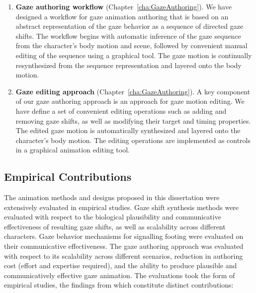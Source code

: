 \begin{enumerate}
\item \textbf{Gaze authoring workflow} (Chapter~\ref{cha:GazeAuthoring}). We have designed a workflow for gaze animation authoring that is based on an abstract representation of the gaze behavior as a sequence of directed gaze shifts. The workflow begins with automatic inference of the gaze sequence from the character's body motion and scene, followed by convenient manual editing of the sequence using a graphical tool. The gaze motion is continually resynthesized from the sequence representation and layered onto the body motion.
\item \textbf{Gaze editing approach} (Chapter~\ref{cha:GazeAuthoring}). A key component of our gaze authoring approach is an approach for gaze motion editing. We have define a set of convenient editing operations such as adding and removing gaze shifts, as well as modifying their target and timing properties. The edited gaze motion is automatically synthesized and layered onto the character's body motion. The editing operations are implemented as controls in a graphical animation editing tool.
\end{enumerate}

\subsection{Empirical Contributions}

The animation methods and designs proposed in this dissertation were extensively evaluated in empirical studies. Gaze shift synthesis methods were evaluated with respect to the biological plausibility and communicative effectiveness of resulting gaze shifts, as well as scalability across different characters. Gaze behavior mechanisms for signalling footing were evaluated on their communicative effectiveness. The gaze authoring approach was evaluated with respect to its scalability across different scenarios, reduction in authoring cost (effort and expertise required), and the ability to produce plausible and communicatively effective gaze animation. The evaluations took the form of empirical studies, the findings from which constitute distinct contributions:

